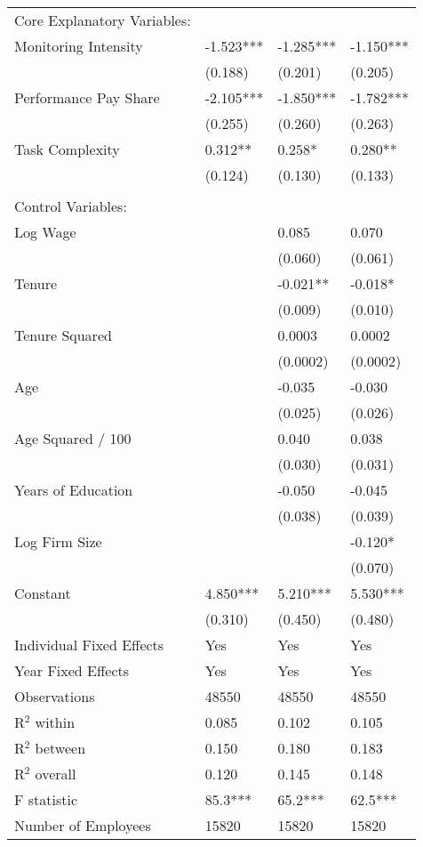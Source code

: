 {\begin{longtable}{p{5cm} p{2.2cm} p{2.2cm} p{2.2cm}}
{Core Explanatory Variables:} & & & \\
\quad Monitoring Intensity & -1.523*** & -1.285*** & -1.150*** \\
& (0.188) & (0.201) & (0.205) \\
\quad Performance Pay Share & -2.105*** & -1.850*** & -1.782*** \\
& (0.255) & (0.260) & (0.263) \\
\quad Task Complexity & 0.312** & 0.258* & 0.280** \\
& (0.124) & (0.130) & (0.133) \\
\\
{Control Variables:} & & & \\
\quad Log Wage & & 0.085 & 0.070 \\
& & (0.060) & (0.061) \\
\quad Tenure & & -0.021** & -0.018* \\
& & (0.009) & (0.010) \\
\quad Tenure Squared & & 0.0003 & 0.0002 \\
& & (0.0002) & (0.0002) \\
\quad Age & & -0.035 & -0.030 \\
& & (0.025) & (0.026) \\
\quad Age Squared / 100 & & 0.040 & 0.038 \\
& & (0.030) & (0.031) \\
\quad Years of Education & & -0.050 & -0.045 \\
& & (0.038) & (0.039) \\
\quad Log Firm Size & & & -0.120* \\
& & & (0.070) \\
\quad Constant & 4.850*** & 5.210*** & 5.530*** \\
& (0.310) & (0.450) & (0.480) \\
\midrule
Individual Fixed Effects & Yes & Yes & Yes \\
Year Fixed Effects & Yes & Yes & Yes \\
\midrule
Observations & 48550 & 48550 & 48550 \\
R$^2$ within & 0.085 & 0.102 & 0.105 \\
R$^2$ between & 0.150 & 0.180 & 0.183 \\
R$^2$ overall & 0.120 & 0.145 & 0.148 \\
F statistic & 85.3*** & 65.2*** & 62.5*** \\
Number of Employees & 15820 & 15820 & 15820 \\

\end{longtable}
}

